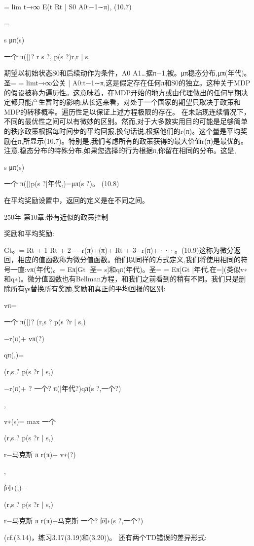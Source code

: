 = lim
t→∞
E(t Rt | S0 A0:−1∼π), 					(10.7)

=

s
μπ(s)

一个
π(|)?
r s ?,
p(s ?)r,r | s,


期望以初始状态S0和后续动作为条件，A0 A1…据π−1,被。μπ稳态分布,μπ(年代)。圣= = limt→∞公关{ | A0:t−1∼π},这是假定存在任何π和S0的独立。这种关于MDP的假设被称为遍历性。这意味着，在MDP开始的地方或由代理做出的任何早期决定都只能产生暂时的影响;从长远来看，对处于一个国家的期望只取决于政策和MDP的转移概率。遍历性足以保证上述方程极限的存在。
在未贴现连续情况下，不同的最优性之间可以有微妙的区别。然而,对于大多数实用目的可能是足够简单的秩序政策根据每时间步的平均回报,换句话说,根据他们的r(π)。这个量是平均奖励在π,所显示(10.7)。特别是,我们考虑所有的政策获得的最大价值r(π)是最优的。
注意,稳态分布的特殊分布,如果您选择的行为根据π,你留在相同的分布。这是,

s
μπ(s)

一个
π(|)p(s ?|年代,)=μπ(s ?)。 					(10.8)

在平均奖励设置中，返回的定义是在不同之间。

250年 					第10章:带有近似的政策控制



奖励和平均奖励:

Gt。= Rt + 1 Rt + 2−−r(π)+(π)+ Rt + 3−r(π)+···。(10.9)这称为微分返回，相应的值函数称为微分值函数。他们以同样的方式定义,我们将使用相同的符号一直:vπ(年代)。= Eπ[Gt |圣= s]和qπ(年代)。圣= = Eπ[Gt |年代,在=](类似v∗和q∗)。微分值函数也有Bellman方程，和我们之前看到的稍有不同。我们只是删除所有γs替换所有奖励,奖励和真正的平均回报的区别:

vπ=

一个
π(|)?
(r,s ?
p(s ?r | s,)

−r(π)+ vπ(?)


qπ(,)=

(r,s ?
p(s ?r | s,)

−r(π)+ ?
一个?
π(|年代?)qπ(s ?,一个?)

,




v∗(s)= max
一个

(r,s ?
p(s ?r | s,)

r−马克斯
π
r(π)+ v∗(?)

,


问∗(,)=

(r,s ?
p(s ?r | s,)

r−马克斯
π
r(π)+马克斯
一个?
问∗(s ?,一个?)

(cf.(3.14)，练习3.17(3.19)和(3.20))。
还有两个TD错误的差异形式:

